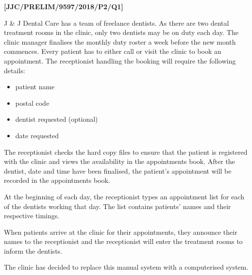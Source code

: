 \item \textbf{{[}JJC/PRELIM/9597/2018/P2/Q1{]} }

J \& J Dental Care has a team of freelance dentists. As there are
two dental treatment rooms in the clinic, only two dentists may be
on duty each day. The clinic manager finalises the monthly duty roster
a week before the new month commences. Every patient has to either
call or visit the clinic to book an appointment. The receptionist
handling the booking will require the following details: 
\begin{itemize}
\item patient name 
\item postal code 
\item dentist requested (optional)
\item date requested 
\end{itemize}
The receptionist checks the hard copy files to ensure that the patient
is registered with the clinic and views the availability in the appointments
book. After the dentist, date and time have been finalised, the patient\textquoteright s
appointment will be recorded in the appointments book.

At the beginning of each day, the receptionist types an appointment
list for each of the dentists working that day. The list contains
patients\textquoteright{} names and their respective timings. 

When patients arrive at the clinic for their appointments, they announce
their names to the receptionist and the receptionist will enter the
treatment rooms to inform the dentists. 

The clinic has decided to replace this manual system with a computerised
system. 

